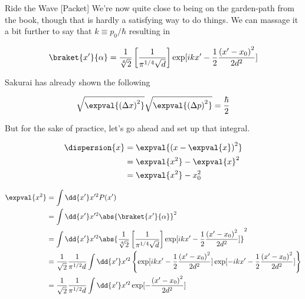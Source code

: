 \begin{answer}
\begin{answerpart}{Ride the Wave [Packet]}
    We're now quite close to being on the garden-path from the book,
    though that is hardly a satisfying way to do things.  We can
    massage it a bit further to say that $k \equiv p_0/\hbar$
    resulting in

    \begin{equation}
      \braket{x'}{\alpha} =
      \frac{1}{\sqrt[4]{2}}
      \left[
        \frac{1}{\pi^{1/4}\sqrt{d}}\right]
      \exp[
        ikx'
        -  \frac{1}{2}\frac{\left(x' - x_0\right)^2}{2d^2}
        ]
    \end{equation}

    Sakurai has already shown the following

    \begin{equation}
      \sqrt{\expval{\left(\Delta x\right)^2}}
      \sqrt{\expval{\left(\Delta p\right)^2}}
      = \frac{\hbar}{2}
    \end{equation}

    But for the sake of practice, let's go ahead and set up that
    integral.
    
    \begin{equation}
      \begin{split}
        \dispersion{x}
        &= \expval{\left(x - \expval{x}\right)^2}\\
        &=  \expval{x^2} - \expval{x}^2\\
        &= \expval{x^2} - x_0^2\\
      \end{split}
    \end{equation}

    \begin{equation}
      \begin{split}
        \expval{x^2}
        &= \int \dd{x'} x'^2 P(x')\\
        &= \int \dd{x'} x'^2 \abs{\braket{x'}{\alpha}}^2\\
        &= \int \dd{x'} x'^2 \abs{
          \frac{1}{\sqrt[4]{2}}
          \left[
            \frac{1}{\pi^{1/4}\sqrt{d}}\right]
          \exp[
            ikx'
            - \frac{1}{2}\frac{\left(x' - x_0\right)^2}{2d^2}
          ]
        }^2\\
        &=
        \frac{1}{\sqrt{2}}
        \frac{1}{\pi^{1/2}d}
        \int \dd{x'} x'^2
        \left\{
          \exp[
            ikx'
            - \frac{1}{2}\frac{\left(x' - x_0\right)^2}{2d^2}
          ]
          \exp[
            - ikx'
            - \frac{1}{2}\frac{\left(x' - x_0\right)^2}{2d^2}
          ]
          \right\}
          \\
        &=
        \frac{1}{\sqrt{2}}
        \frac{1}{\pi^{1/2}d}
        \int \dd{x'} x'^2
          \exp[- \frac{\left(x' - x_0\right)^2}{2d^2}]
          \\
      \end{split}
    \end{equation}


\end{answerpart}
\end{answer}
